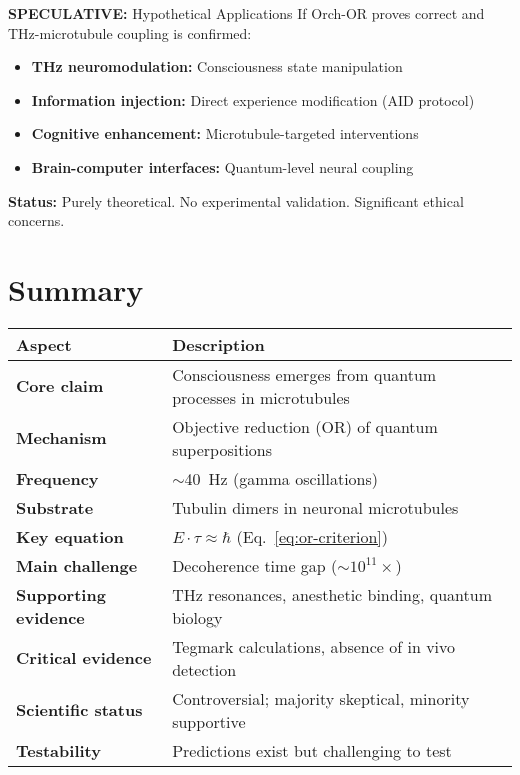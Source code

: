 \begin{calloutbox}[colback=red!5!white,colframe=red!75!black]{\textbf{SPECULATIVE:} Hypothetical Applications}
If Orch-OR proves correct and THz-microtubule coupling is confirmed:
\begin{itemize}
\item \textbf{THz neuromodulation:} Consciousness state manipulation
\item \textbf{Information injection:} Direct experience modification (AID protocol)
\item \textbf{Cognitive enhancement:} Microtubule-targeted interventions
\item \textbf{Brain-computer interfaces:} Quantum-level neural coupling
\end{itemize}

\textbf{Status:} Purely theoretical. No experimental validation. Significant ethical concerns.
\end{calloutbox}

\section{Summary}

\begin{center}
\begin{tabular}{@{}ll@{}}
\toprule
\textbf{Aspect} & \textbf{Description} \\
\midrule
\textbf{Core claim} & Consciousness emerges from quantum processes in microtubules \\
\textbf{Mechanism} & Objective reduction (OR) of quantum superpositions \\
\textbf{Frequency} & $\sim$40~Hz (gamma oscillations) \\
\textbf{Substrate} & Tubulin dimers in neuronal microtubules \\
\textbf{Key equation} & $E \cdot \tau \approx \hbar$ (Eq.~\ref{eq:or-criterion}) \\
\textbf{Main challenge} & Decoherence time gap ($\sim10^{11}\times$) \\
\textbf{Supporting evidence} & THz resonances, anesthetic binding, quantum biology \\
\textbf{Critical evidence} & Tegmark calculations, absence of in vivo detection \\
\textbf{Scientific status} & Controversial; majority skeptical, minority supportive \\
\textbf{Testability} & Predictions exist but challenging to test \\
\bottomrule
\end{tabular}
\end{center}

